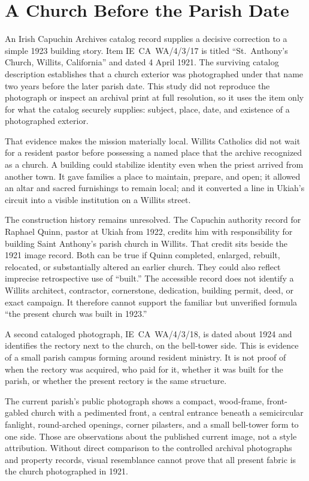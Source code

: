 \section{A Church Before the Parish Date}

An Irish Capuchin Archives catalog record supplies a decisive correction to a simple 1923 building story. Item IE~CA~WA/4/3/17 is titled ``St.~Anthony's Church, Willits, California'' and dated 4 April 1921. The surviving catalog description establishes that a church exterior was photographed under that name two years before the later parish date. This study did not reproduce the photograph or inspect an archival print at full resolution, so it uses the item only for what the catalog securely supplies: subject, place, date, and existence of a photographed exterior.

That evidence makes the mission materially local. Willits Catholics did not wait for a resident pastor before possessing a named place that the archive recognized as a church. A building could stabilize identity even when the priest arrived from another town. It gave families a place to maintain, prepare, and open; it allowed an altar and sacred furnishings to remain local; and it converted a line in Ukiah's circuit into a visible institution on a Willits street.

The construction history remains unresolved. The Capuchin authority record for Raphael Quinn, pastor at Ukiah from 1922, credits him with responsibility for building Saint Anthony's parish church in Willits. That credit sits beside the 1921 image record. Both can be true if Quinn completed, enlarged, rebuilt, relocated, or substantially altered an earlier church. They could also reflect imprecise retrospective use of ``built.'' The accessible record does not identify a Willits architect, contractor, cornerstone, dedication, building permit, deed, or exact campaign. It therefore cannot support the familiar but unverified formula ``the present church was built in 1923.''

A second cataloged photograph, IE~CA~WA/4/3/18, is dated about 1924 and identifies the rectory next to the church, on the bell-tower side. This is evidence of a small parish campus forming around resident ministry. It is not proof of when the rectory was acquired, who paid for it, whether it was built for the parish, or whether the present rectory is the same structure.

The current parish's public photograph shows a compact, wood-frame, front-gabled church with a pedimented front, a central entrance beneath a semicircular fanlight, round-arched openings, corner pilasters, and a small bell-tower form to one side. Those are observations about the published current image, not a style attribution. Without direct comparison to the controlled archival photographs and property records, visual resemblance cannot prove that all present fabric is the church photographed in 1921.

